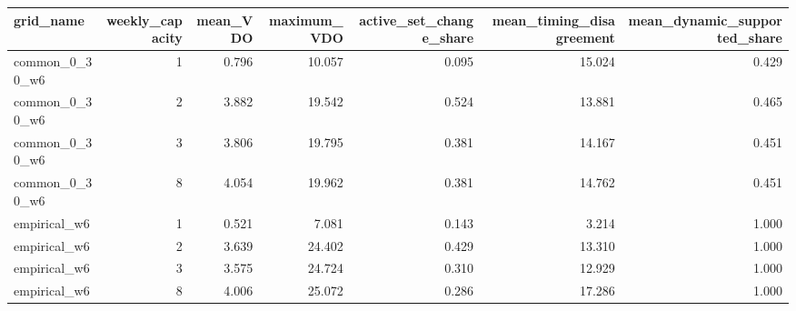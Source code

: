 \begin{tabular}{lrrrrrr}
\toprule
grid_name & weekly_capacity & mean_VDO & maximum_VDO & active_set_change_share & mean_timing_disagreement & mean_dynamic_supported_share \\
\midrule
common_0_30_w6 & 1 & 0.796 & 10.057 & 0.095 & 15.024 & 0.429 \\
common_0_30_w6 & 2 & 3.882 & 19.542 & 0.524 & 13.881 & 0.465 \\
common_0_30_w6 & 3 & 3.806 & 19.795 & 0.381 & 14.167 & 0.451 \\
common_0_30_w6 & 8 & 4.054 & 19.962 & 0.381 & 14.762 & 0.451 \\
empirical_w6 & 1 & 0.521 & 7.081 & 0.143 & 3.214 & 1.000 \\
empirical_w6 & 2 & 3.639 & 24.402 & 0.429 & 13.310 & 1.000 \\
empirical_w6 & 3 & 3.575 & 24.724 & 0.310 & 12.929 & 1.000 \\
empirical_w6 & 8 & 4.006 & 25.072 & 0.286 & 17.286 & 1.000 \\
\bottomrule
\end{tabular}
